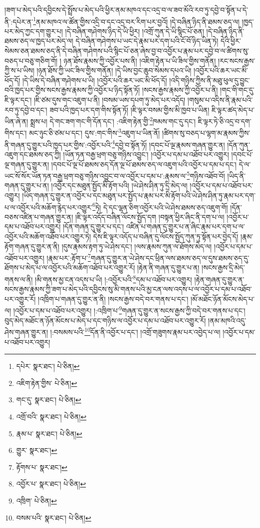།ཟག་པ་མེད་པའི་དབྱིངས་དེ་སྤྲོས་པ་མེད་པའི་ཕྱིར་ནམ་མཁའ་དང་འདྲ་བ་ལ་ཟབ་མོའི་རབ་ཏུ་དབྱེ་བ་སྟོན་པ་དེ་ནི་:དཔེར་ན་\footnote{དཔེར་  སྣར་ཐང་།  པེ་ཅིན། }ནམ་མཁའ་ལ་ཚོན་གྱིས་འདྲི་བ་དང་འདྲ་བར་རིག་པར་བྱའོ། །དེ་བཞིན་ཉིད་ནི་ཐམས་ཅད་ལ། །ཁྱད་པར་མེད་ཀྱང་དག་གྱུར་པ། །དེ་བཞིན་གཤེགས་ཉིད་དེ་ཡི་ཕྱིར། །འགྲོ་ཀུན་དེ་ཡི་སྙིང་པོ་ཅན། །དེ་བཞིན་ཉིད་ནི་ཐམས་ཅད་ལ་ཁྱད་པར་མེད་ལ། དེ་བཞིན་གཤེགས་པ་ཡང་དེ་རྣམ་པར་དག་པའི་ངོ་བོ་ཉིད་ཡིན་ཏེ། དེའི་ཕྱིར་སེམས་ཅན་ཐམས་ཅད་ནི་དེ་བཞིན་གཤེགས་པའི་སྙིང་པོ་ཅན་ཞེས་བྱ་བ་འབྱོར་པ་རྣམ་པར་དབྱེ་བ་ལ་ཚིགས་སུ་བཅད་པ་བཅུ་གཅིག་གོ། །
ཉན་ཐོས་རྣམས་ཀྱི་འབྱོར་པས་ནི། །འཇིག་རྟེན་པ་ཡི་ཟིལ་གྱིས་གནོན། །རང་སངས་རྒྱས་ཀྱི་ས་པ་ཡིས། །ཉན་ཐོས་ཀྱི་ཡང་ཟིལ་གྱིས་གནོན། །དེ་ཡིས་བྱང་ཆུབ་སེམས་དཔའ་ཡི། །འབྱོར་པའི་ཆར་ཡང་མི་ཕོད་དོ། །དེ་ཡིས་དེ་བཞིན་གཤེགས་པ་ཡི། །འབྱོར་པའི་ཆར་ཡང་མི་ཕོད་དོ། །འདི་གཉིས་ཀྱིས་ནི་མཐུ་ཕུལ་དུ་བྱུང་བའི་ཁྱད་པར་གྱིས་སངས་རྒྱས་རྣམས་ཀྱི་འབྱོར་པ་ཉིད་སྟོན་ཏོ། །སངས་རྒྱས་རྣམས་ཀྱི་འབྱོར་པ་ནི། །གང་གི་གང་དུ་ཇི་ལྟར་དང་། །ཇི་ཙམ་དུས་གང་འཇུག་པ་ནི། །བསམ་ཡས་དཔག་ཏུ་མེད་པར་འདོད། །གསུམ་པ་འདིས་ནི་རྣམ་པའི་རབ་ཏུ་དབྱེ་བ་དང་། ཟབ་པའི་ཁྱད་པར་དག་གིས་སྟོན་ཏོ། །ཇི་ལྟར་བསམ་གྱིས་མི་ཁྱབ་པ་ཡིན། ཇི་ལྟར་ཚད་མེད་པ་ཡིན་ཞེ་ན། སྨྲས་པ། དེ་གང་ཟག་གང་གི་དོན་དང་། :འཇིག་རྟེན་གྱི་\footnote{འཇིག་རྟེན་གྱིས་  པེ་ཅིན། }ཁམས་གང་དུ་དང་། ཇི་ལྟར་ཏེ་ཅི་འདྲ་བ་དག་གིས་དང་། མང་ཉུང་ཅི་ཙམ་པ་དང་། དུས་:གང་གིས་\footnote{གང་དུ་  སྣར་ཐང་།  པེ་ཅིན། }འཇུག་པ་ཡིན་ནོ། །ཚིགས་སུ་བཅད་པ་ལྷག་མ་རྣམས་ཀྱིས་ནི་གཞན་དུ་གྱུར་པའི་ཁྱད་པར་གྱིས་:འབྱོར་པའི་\footnote{འགྲོ་བའི་  སྣར་ཐང་།  པེ་ཅིན། }དབྱེ་བ་སྟོན་ཏོ། །དབང་པོ་ལྔ་རྣམས་གཞན་གྱུར་ན། །དོན་ཀུན་འཇུག་དང་ཐམས་ཅད་ཀྱི། །ཡོན་ཏན་བརྒྱ་ཕྲག་བཅུ་གཉིས་འབྱུང་། །འབྱོར་པ་དམ་པ་འཐོབ་པར་འགྱུར། །དབང་པོ་ལྔ་གཞན་དུ་གྱུར་ན། །དབང་པོ་ལྔ་པོ་ཐམས་ཅད་དོན་ལྔ་པོ་ཐམས་ཅད་ལ་འཇུག་པའི་འབྱོར་པ་དམ་པ་དང་། དེ་ལ་ཡང་སོ་སོར་ཡོན་ཏན་བརྒྱ་ཕྲག་བཅུ་གཉིས་འབྱུང་བ་ལ་འབྱོར་པ་དམ་པ་:རྣམས་ལ་\footnote{རྣམ་པ་  སྣར་ཐང་།  པེ་ཅིན། }གཉིས་འཐོབ་བོ། །ཡིད་ནི་གཞན་དུ་གྱུར་པ་ན། །འབྱོར་དང་མཐུན་སྤྱོད་མི་རྟོག་པའི། །ཡེ་ཤེས་ཤིན་ཏུ་དྲི་མེད་ལ། །འབྱོར་པ་དམ་པ་འཐོབ་པར་འགྱུར། །ཡིད་གཞན་དུ་གྱུར་ན་འབྱོར་པ་དང་མཐུན་པར་སྤྱོད་པ་རྣམ་པར་མི་རྟོག་པའི་ཡེ་ཤེས་ཤིན་ཏུ་རྣམ་པར་དག་པ་ལ་འབྱོར་པའི་མཆོག་རྙེད་པར་འགྱུར་\footnote{གྱུར་  སྣར་ཐང་། }ཏེ། དེ་དང་ལྷན་ཅིག་འབྱོར་པའི་ཡེ་ཤེས་ཐམས་ཅད་འཇུག་གོ། །དོན་བཅས་འཛིན་པ་གཞན་གྱུར་ན། །ཇི་ལྟར་འདོད་བཞིན་ལོངས་སྤྱོད་དག །བསྟན་ཕྱིར་ཞིང་ནི་དག་པ་ལ། །འབྱོར་པ་དམ་པ་འཐོབ་པར་འགྱུར། །དོན་གཞན་དུ་གྱུར་པ་དང་། འཛིན་པ་གཞན་དུ་གྱུར་པ་ན་ཞིང་རྣམ་པར་དག་པ་ལ་འབྱོར་པའི་མཆོག་འཐོབ་པར་འགྱུར་ཏེ། དེས་ཇི་ལྟར་འདོད་པ་བཞིན་དུ་ལོངས་སྤྱོད་ཀུན་ཏུ་སྟོན་པར་བྱེད་དོ། །རྣམ་རྟོག་གཞན་དུ་གྱུར་ན་ནི། །དུས་རྣམས་རྟག་ཏུ་ཡེ་ཤེས་དང་། །ལས་རྣམས་ཀུན་ལ་ཐོགས་མེད་ལ། །འབྱོར་པ་དམ་པ་འཐོབ་པར་འགྱུར། །རྣམ་པར་:རྟོག་པ་\footnote{རྟོགས་པ་  སྣར་ཐང་། }གཞན་དུ་གྱུར་ན་ཡེ་ཤེས་དང་ཕྲིན་ལས་ཐམས་ཅད་ལ་དུས་ཐམས་ཅད་དུ་ཐོགས་པ་མེད་པ་ལ་འབྱོར་པའི་མཆོག་འཐོབ་པར་འགྱུར་རོ། །རྟེན་ནི་གཞན་དུ་གྱུར་པ་ན། །སངས་རྒྱས་དྲི་མེད་གནས་ལ་ནི། །མི་གནས་མྱ་ངན་འདས་པ་ཡི། །:འབྱོར་པའི་\footnote{འབྱོར་པ་  སྣར་ཐང་།  པེ་ཅིན། }དམ་པ་འཐོབ་པར་འགྱུར། །རྟེན་གཞན་དུ་གྱུར་ན་སངས་རྒྱས་རྣམས་ཀྱི་ཟག་པ་མེད་པའི་དབྱིངས་སུ་མི་གནས་པའི་མྱ་ངན་ལས་འདས་པ་ལ་འབྱོར་པ་དམ་པ་འཐོབ་པར་འགྱུར་རོ། །འཁྲིག་པ་གཞན་དུ་གྱུར་ན་ནི། །སངས་རྒྱས་བདེ་བར་གནས་པ་དང་། །མོ་མཐོང་ཉོན་མོངས་མེད་པ་ལ། །འབྱོར་པ་དམ་པ་འཐོབ་པར་འགྱུར། །:འཁྲིག་པ་\footnote{འཁྲིག་  པེ་ཅིན། }གཞན་དུ་གྱུར་ན་སངས་རྒྱས་ཀྱི་བདེ་བར་གནས་པ་དང་། བུད་མེད་མཐོང་ན་ཉོན་མོངས་པ་མེད་པ་དང་གཉིས་ལ་འབྱོར་པ་དམ་པ་འཐོབ་པར་འགྱུར་རོ། །ནམ་མཁའི་འདུ་ཤེས་གཞན་གྱུར་ན། །:བསམས་པའི་\footnote{བསམ་པའི་  སྣར་ཐང་།  པེ་ཅིན། }དོན་ནི་འབྱོར་པ་དང་། །འགྲོ་གཟུགས་རྣམ་པར་འབྱེད་པ་ལ། །འབྱོར་པ་དམ་པ་འཐོབ་པར་འགྱུར། 